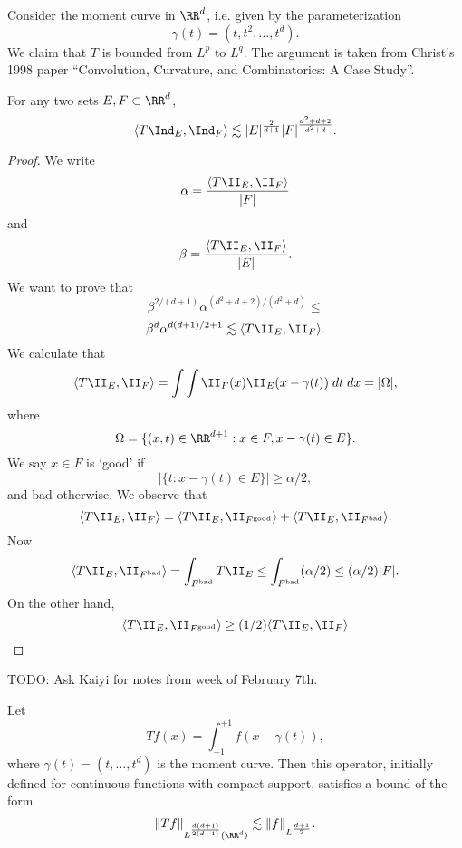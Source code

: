 Consider the moment curve in $\RR^d$, i.e. given by the parameterization
%
\[ \gamma(t) = (t,t^2,\dots,t^d). \]
%
We claim that $T$ is bounded from $L^p$ to $L^q$. The argument is taken from Christ's 1998 paper ``Convolution, Curvature, and Combinatorics: A Case Study''.

\begin{theorem}[Christ (1998)]
    For any two sets $E,F \subset \RR^d$,
    \[ \langle T \Ind_E, \Ind_F \rangle \lesssim |E|^{\frac{2}{d+1}} |F|^{\frac{d^2 + d + 2}{d^2 + d}}. \]
\end{theorem}
\begin{proof}
    We write
    \begin{align*}
        \alpha = \frac{\langle T \II_E, \II_F \rangle}{|F|}
    \end{align*}
    and
    \[ \beta = \frac{\langle T \II_E, \II_F \rangle}{|E|}. \]
    We want to prove that
    \[ \beta^{2/(d+1)} \alpha^{(d^2 + d + 2) / (d^2 + d)} \leq \]
    \[ \beta^d \alpha^{d(d+1)/2 + 1} \lesssim \langle T \II_E, \II_F \rangle. \]
    We calculate that
    \[ \langle T \II_E, \II_F \rangle = \int \int \II_F(x) \II_E(x - \gamma(t))\; dt\; dx = |\Omega|, \]
    where
    \[ \Omega = \{ (x,t) \in \RR^{d+1}: x \in F, x - \gamma(t) \in E \}. \]
    We say $x \in F$ is `good' if
    \[ |\{ t : x - \gamma(t) \in E \}| \geq \alpha / 2, \]
    and bad otherwise. We observe that
    \[ \langle T\II_E, \II_F \rangle = \langle T \II_E, \II_{F^{\text{good}}} \rangle + \langle T \II_E, \II_{F^{\text{bad}}} \rangle. \]
    Now
    \[ \langle T \II_E, \II_{F^{\text{bad}}} \rangle = \int_{F^{\text{bad}}} T \II_E \leq \int_{F^{\text{bad}}} (\alpha / 2) \leq (\alpha / 2) |F|. \]
    On the other hand,
    \[ \langle T \II_E, \II_{F^{\text{good}}} \rangle \geq (1/2) \langle T \II_E, \II_F \rangle \]
\end{proof}

TODO: Ask Kaiyi for notes from week of February 7th.

\begin{theorem}
    Let
    \[ Tf(x) = \int_{-1}^{+1} f(x - \gamma(t)), \]
    where $\gamma(t) = (t,\dots,t^d)$ is the moment curve. Then this operator, initially defined for continuous functions with compact support, satisfies a bound of the form
    \[ \| Tf \|_{L^{\frac{d(d+1)}{2(d-1)}}(\RR^d)} \lesssim \| f \|_{L^{\frac{d+1}{2}}}. \]
\end{theorem}

